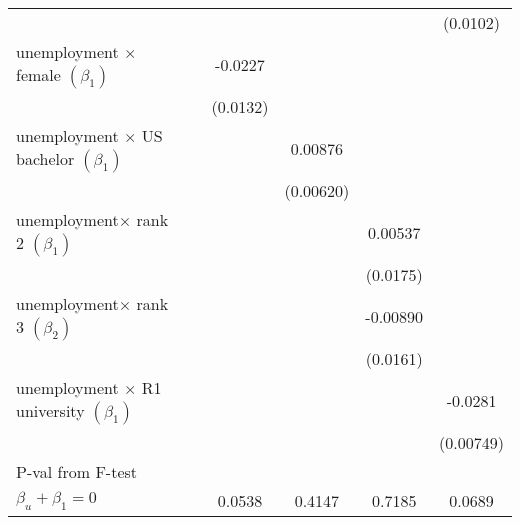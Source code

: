 \begin{table}[ht]
{\begin{tabular}{l*{5}{c}}
&                     &                     &                     &                     &    (0.0102)         \\
[1em]
unemployment $\times$ female  $\left( \beta_1 \right)$&                     &     -0.0227         &                     &                     &                     \\
            &                     &    (0.0132)         &                     &                     &                     \\
[1em]
unemployment $\times$ US bachelor  $\left( \beta_1 \right)$&                     &                     &     0.00876         &                     &                     \\
            &                     &                     &   (0.00620)         &                     &                     \\
[1em]
unemployment$\times$ rank 2  $\left( \beta_1 \right)$&                     &                     &                     &     0.00537         &                     \\
            &                     &                     &                     &    (0.0175)         &                     \\
[1em]
unemployment$\times$ rank 3  $\left( \beta_2 \right)$&                     &                     &                     &    -0.00890         &                     \\
            &                     &                     &                     &    (0.0161)         &                     \\
[1em]
unemployment $\times$ R1 university  $\left( \beta_1 \right)$&                     &                     &                     &                     &     -0.0281\sym{***}\\
            &                     &                     &                     &                     &   (0.00749)         \\
\hline
P-val from F-test &\\
$\beta_u + \beta_1 = 0 $      &                 &       0.0538     &      0.4147        &   0.7185      &     0.0689


\end{tabular}}
\end{table}
